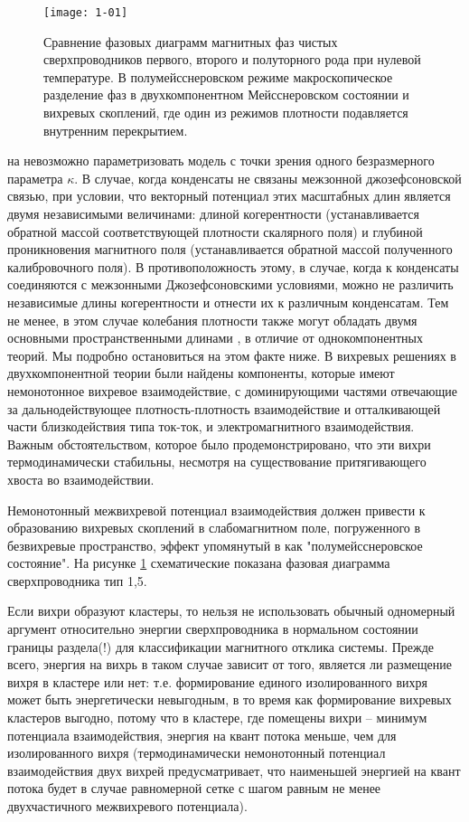 \begin{figure}[h!]
  \texttt{[image: 1-01]}
  \caption{Сравнение фазовых диаграмм магнитных фаз чистых сверхпроводников
    первого, второго и полуторного рода при нулевой температуре. В 
    полумейсснеровском режиме макроскопическое разделение фаз в 
    двухкомпонентном Мейсснеровском состоянии и вихревых скоплений, где один 
    из режимов плотности подавляется внутренним перекрытием.}
  \label{fig:1}
\end{figure}

на невозможно параметризовать модель с точки зрения одного безразмерного 
параметра \( \kappa \). В случае, когда конденсаты не связаны межзонной 
джозефсоновской связью, при условии, что векторный потенциал этих масштабных 
длин является двумя независимыми величинами: длиной когерентности 
(устанавливается обратной массой соответствующей плотности скалярного поля) и 
глубиной проникновения магнитного поля (устанавливается обратной массой 
полученного калибровочного поля). В противоположность этому, в случае, когда к 
конденсаты соединяются с межзонными Джозефсоновскими условиями, можно не 
различить независимые длины когерентности и отнести их к различным 
конденсатам. Тем не менее, в этом случае колебания плотности также могут 
обладать двумя основными пространственными длинами \cite{bib:2}, в отличие от 
однокомпонентных теорий. Мы подробно остановиться на этом факте ниже. В 
\cite{bib:1,bib:2} вихревых решениях в двухкомпонентной теории были найдены 
компоненты, которые имеют немонотонное вихревое взаимодействие, с 
доминирующими частями отвечающие за дальнодействующее плотность-плотность 
взаимодействие и отталкивающей части  близкодействия типа ток-ток, и 
электромагнитного взаимодействия. Важным обстоятельством, которое было 
продемонстрировано, что эти вихри термодинамически стабильны, несмотря на 
существование притягивающего хвоста во взаимодействии.

Немонотонный межвихревой потенциал взаимодействия должен привести к 
образованию вихревых скоплений в слабомагнитном поле, погруженного в 
безвихревые пространство, эффект упомянутый в \cite{bib:1} как 
"полумейсснеровское состояние". На рисунке \ref{fig:1} схематические показана 
фазовая диаграмма сверхпроводника тип 1,5.

Если вихри образуют кластеры, то нельзя не использовать обычный одномерный 
аргумент относительно энергии сверхпроводника в нормальном состоянии границы 
раздела(!) для классификации магнитного отклика системы. Прежде всего, энергия 
на вихрь в таком случае зависит от того, является ли размещение вихря в 
кластере или нет: т.е. формирование единого изолированного вихря может быть 
энергетически невыгодным, в то время как формирование вихревых кластеров 
выгодно, потому что в кластере, где помещены вихри -- минимум потенциала 
взаимодействия, энергия на квант потока меньше, чем для изолированного вихря
(термодинамически немонотонный потенциал взаимодействия двух вихрей 
предусматривает, что наименьшей энергией на квант потока будет в случае 
равномерной сетке с шагом равным не менее двухчастичного межвихревого 
потенциала).

